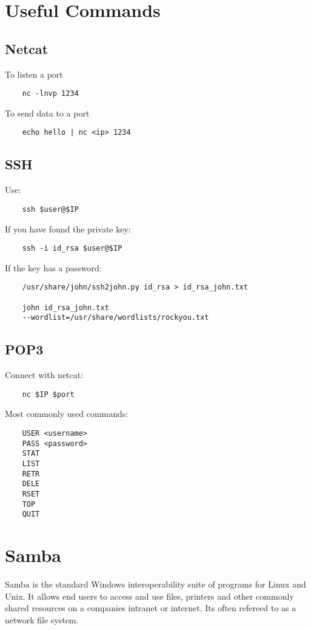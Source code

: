 \documentclass[12pt,a4paper]{scrartcl}
\begin{document}
\section{Useful Commands}
\subsection{Netcat}
To listen a port
\begin{lstlisting}
	nc -lnvp 1234
\end{lstlisting}
To send data to a port
\begin{lstlisting}
	echo hello | nc <ip> 1234
\end{lstlisting}

\subsection{SSH}
Use:
\begin{lstlisting}
	ssh $user@$IP
\end{lstlisting}
If you have found the private key:
\begin{lstlisting}
	ssh -i id_rsa $user@$IP
\end{lstlisting}
If the key has a password:
\begin{lstlisting}
	/usr/share/john/ssh2john.py id_rsa > id_rsa_john.txt
	
	john id_rsa_john.txt
	--wordlist=/usr/share/wordlists/rockyou.txt
\end{lstlisting}

\subsection{POP3}
Connect with netcat:
\begin{lstlisting}
	nc $IP $port
\end{lstlisting}
Most commonly used commands:
\begin{lstlisting}
	USER <username>
	PASS <password>
	STAT
	LIST
	RETR
	DELE
	RSET
	TOP
	QUIT
\end{lstlisting}

\section{Samba}
Samba is the standard Windows interoperability suite of programs for Linux and Unix. It allows end users to access and use files, printers and other commonly shared resources on a companies intranet or internet. Its often refereed to as a network file system.
\end{document}
